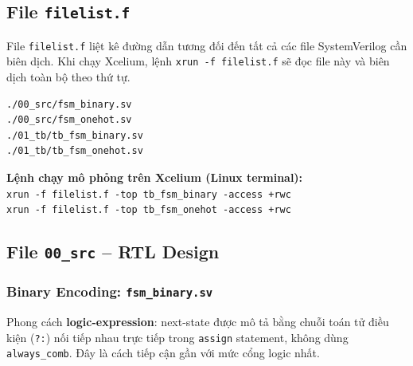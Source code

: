 \documentclass[12pt, a4paper]{article}
\begin{document}
\subsection{File \texttt{filelist.f}}
\label{subsec:exp3-filelist}

File \texttt{filelist.f} liệt kê đường dẫn tương đối đến tất cả các file SystemVerilog cần biên dịch. Khi chạy Xcelium, lệnh \texttt{xrun -f filelist.f} sẽ đọc file này và biên dịch toàn bộ theo thứ tự.

\begin{lstlisting}[style=plainfile, caption={Nội dung file \texttt{filelist.f} -- Experiment 3.}]
./00_src/fsm_binary.sv
./00_src/fsm_onehot.sv
./01_tb/tb_fsm_binary.sv
./01_tb/tb_fsm_onehot.sv
\end{lstlisting}

\begin{infobox}
\textbf{Lệnh chạy mô phỏng trên Xcelium (Linux terminal):}\\[4pt]
\texttt{xrun -f filelist.f -top tb\_fsm\_binary -access +rwc}\\
\texttt{xrun -f filelist.f -top tb\_fsm\_onehot -access +rwc}
\end{infobox}

\subsection{File \texttt{00\_src} -- RTL Design}
\label{subsec:exp3-src}

\subsubsection{Binary Encoding: \texttt{fsm\_binary.sv}}

Phong cách \textbf{logic-expression}: next-state được mô tả bằng chuỗi toán tử điều kiện (\texttt{?:}) nối tiếp nhau trực tiếp trong \texttt{assign} statement, không dùng \texttt{always\_comb}. Đây là cách tiếp cận gần với mức cổng logic nhất.
\end{document}
